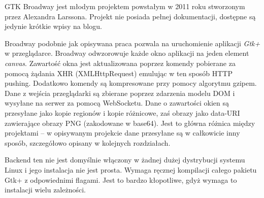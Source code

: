 GTK Broadway jest młodym projektem powstałym w 2011 roku stworzonym przez Alexandra Larssona. Projekt nie posiada pełnej dokumentacji, dostępne są jedynie krótkie wpisy na blogu\cite{broadway1,broadway2}.

Broadway podobnie jak opisywana praca pozwala na uruchomienie aplikacji \emph{Gtk+} w przeglądarce. Broadway odwzorowuje każde okno aplikacji na jeden element \emph{canvas}. Zawartość okna jest aktualizowana poprzez komendy pobierane za pomocą żądania XHR (XMLHttpRequest) emulując w ten sposób HTTP pushing. Dodatkowo komendy są kompresowane przy pomocy algorytmu gzipem. Dane z wejścia przeglądarki są zbierane poprzez zdarzenia modelu DOM i wysyłane na serwer za pomocą WebSocketu. Dane o zawartości okien są przesyłane jako kopie regionów i kopie różnicowe, zaś obrazy jako data-URI zawierające obrazy PNG (zakodowane w base64). Jest to główna różnica między projektami -- w opisywanym projekcie dane przesyłane są w całkowicie inny sposób, szczegółowo opisany w kolejnych rozdziałach.

Backend ten nie jest domyślnie włączony w żadnej dużej dystrybucji systemu Linux i jego instalacja nie jest prosta. Wymaga ręcznej kompilacji całego pakietu Gtk+ z odpowiednimi flagami. Jest to bardzo kłopotliwe, gdyż wymaga to instalacji wielu zależności.